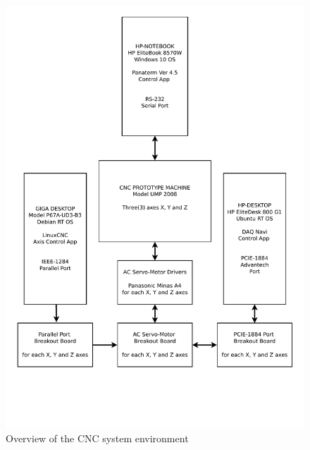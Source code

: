 \clearpage
\pagebreak

\begin{figure}
	\caption{Overview of the CNC system environment}
    \label{Overview-CNC-system-environment.pd}
	\includegraphics[width=1.00\textwidth]{Appendix/Work-environment-setup/Overview-CNC-system-environment.pdf} 

\end{figure}

	